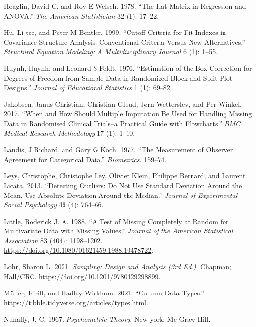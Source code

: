 \documentclass[
  letterpaper,
]{krantz}
\newlength{\cslhangindent}
\newenvironment{CSLReferences}[2] %
 {\begin{list}{}{%
  \setlength{\itemindent}{0pt}
  \setlength{\leftmargin}{0pt}
  \setlength{\parsep}{0pt}
  \ifodd #1
   \setlength{\leftmargin}{\cslhangindent}
   \setlength{\itemindent}{-1\cslhangindent}
  \fi
  \setlength{\itemsep}{#2\baselineskip}}}
 {\end{list}}
\begin{document}
\begin{CSLReferences}{1}{0}
Hoaglin, David C, and Roy E Welsch. 1978. {``The Hat Matrix in
Regression and ANOVA.''} \emph{The American Statistician} 32 (1):
17--22.

Hu, Li-tze, and Peter M Bentler. 1999. {``Cutoff Criteria for Fit
Indexes in Covariance Structure Analysis: Conventional Criteria Versus
New Alternatives.''} \emph{Structural Equation Modeling: A
Multidisciplinary Journal} 6 (1): 1--55.

Huynh, Huynh, and Leonard S Feldt. 1976. {``Estimation of the Box
Correction for Degrees of Freedom from Sample Data in Randomized Block
and Split-Plot Designs.''} \emph{Journal of Educational Statistics} 1
(1): 69--82.

Jakobsen, Janus Christian, Christian Gluud, Jørn Wetterslev, and Per
Winkel. 2017. {``When and How Should Multiple Imputation Be Used for
Handling Missing Data in Randomised Clinical Trials--a Practical Guide
with Flowcharts.''} \emph{BMC Medical Research Methodology} 17 (1):
1--10.

Landis, J Richard, and Gary G Koch. 1977. {``The Measurement of Observer
Agreement for Categorical Data.''} \emph{Biometrics}, 159--74.

Leys, Christophe, Christophe Ley, Olivier Klein, Philippe Bernard, and
Laurent Licata. 2013. {``Detecting Outliers: Do Not Use Standard
Deviation Around the Mean, Use Absolute Deviation Around the Median.''}
\emph{Journal of Experimental Social Psychology} 49 (4): 764--66.

Little, Roderick J. A. 1988. {``A Test of Missing Completely at Random
for Multivariate Data with Missing Values.''} \emph{Journal of the
American Statistical Association} 83 (404): 1198--1202.
\url{https://doi.org/10.1080/01621459.1988.10478722}.

Lohr, Sharon L. 2021. \emph{Sampling: Design and Analysis (3rd Ed.)}.
Chapman; Hall/CRC. \url{https://doi.org/10.1201/9780429298899}.

Müller, Kirill, and Hadley Wickham. 2021. {``Column Data Types.''}
\url{https://tibble.tidyverse.org/articles/types.html}.

Nunally, J. C. 1967. \emph{Psychometric Theory}. New york: Mc Graw-Hill.


\end{CSLReferences}
\end{document}
